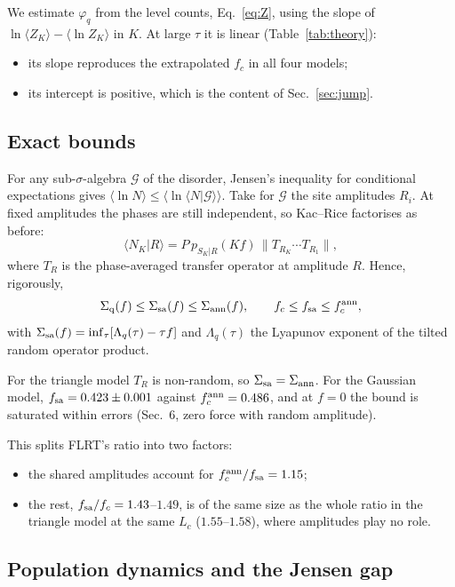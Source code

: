 \documentclass[10pt,a4paper]{article}
\newcommand{\Sann}{\Sigma_{\rm ann}}
\newcommand{\Sq}{\Sigma_{\rm q}}
\begin{document}
We estimate $\varphi_q$ from the level counts, Eq.~\eqref{eq:Z}, using the slope of $\ln\langle Z_K\rangle-\langle\ln Z_K\rangle$ in $K$.
At large $\tau$ it is linear (Table~\ref{tab:theory}):
\begin{itemize}
\item its slope reproduces the extrapolated $f_c$ in all four models;
\item its intercept is positive, which is the content of Sec.~\ref{sec:jump}.
\end{itemize}

\subsection{Exact bounds}

For any sub-$\sigma$-algebra $\mathcal G$ of the disorder, Jensen's inequality for conditional expectations gives $\langle\ln N\rangle\le\langle\ln\langle N|\mathcal G\rangle\rangle$.
Take for $\mathcal G$ the site amplitudes $R_i$.
At fixed amplitudes the phases are still independent, so Kac--Rice factorises as before:
\[
\langle N_K|R\rangle=P\,p_{S_K|R}(Kf)\,\|T_{R_K}\cdots T_{R_1}\|,
\]
where $T_R$ is the phase-averaged transfer operator at amplitude $R$.
Hence, rigorously,
\begin{equation}
\Sq(f)\le\Sigma_{\rm sa}(f)\le\Sann(f),\qquad f_c\le f_{\rm sa}\le f_c^{\rm ann},
\label{eq:bounds}
\end{equation}
with $\Sigma_{\rm sa}(f)=\inf_\tau[\Lambda_q(\tau)-\tau f]$ and $\Lambda_q(\tau)$ the Lyapunov exponent of the tilted random operator product.

For the triangle model $T_R$ is non-random, so $\Sigma_{\rm sa}=\Sann$.
For the Gaussian model, $f_{\rm sa}=0.423\pm0.001$ against $f_c^{\rm ann}=0.486$, and at $f=0$ the bound is saturated within errors (Sec.~6, zero force with random amplitude).

This splits FLRT's ratio into two factors:
\begin{itemize}
\item the shared amplitudes account for $f_c^{\rm ann}/f_{\rm sa}=1.15$;
\item the rest, $f_{\rm sa}/f_c=1.43$--$1.49$, is of the same size as the whole ratio in the triangle model at the same $L_c$ ($1.55$--$1.58$), where amplitudes play no role.
\end{itemize}

\subsection{Population dynamics and the Jensen gap}
\end{document}
